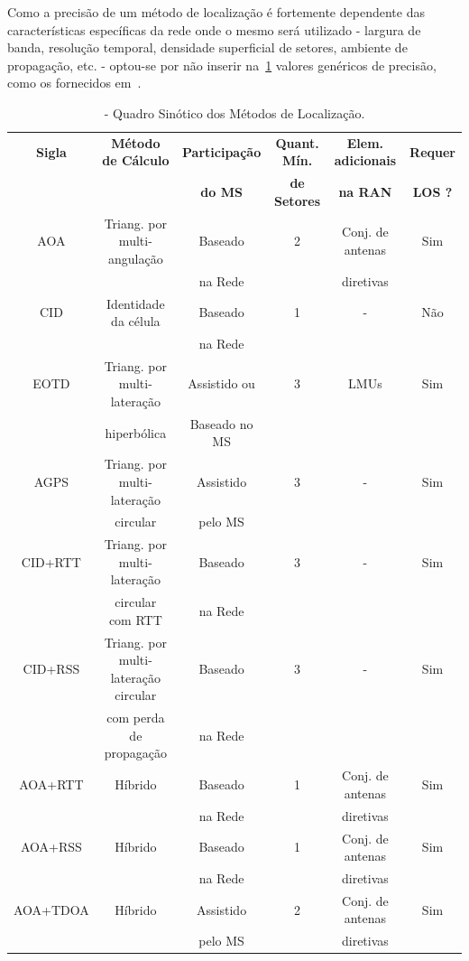 Como a precisão de um método de localização é fortemente dependente das características específicas da rede onde o mesmo será utilizado - largura de banda, resolução temporal, densidade superficial de setores, ambiente de propagação, etc. - optou-se por não inserir na~\ref{tab:quadrosinotico} valores genéricos de precisão, como os fornecidos em~\cite{WlanLocationMethodsSurvey}.

\begin{table}[h]
\centering
\caption{\label{tab:quadrosinotico}- Quadro Sinótico dos Métodos de Localização.}
\vspace*{.1cm}
\begin{scriptsize}
\begin{tabular}{|c|c|c|c|c|c|}
\hline
\textbf{Sigla} & \textbf{Método de Cálculo} & \textbf{Participação} & \textbf{Quant. Mín.} & \textbf{Elem. adicionais} & \textbf{Requer}\\
& & \textbf{do MS} & \textbf{de Setores} & \textbf{na RAN} & \textbf{LOS ?}\\
\hline
AOA	& Triang. por multi-angulação & Baseado & 2	& Conj. de antenas & Sim \\
& & na Rede & & diretivas & \\
\hline
CID	& Identidade da célula	& Baseado & 1	& - & Não\\
& & na Rede & & & \\
\hline
EOTD	& Triang. por multi-lateração &	Assistido ou &	3	& LMUs & Sim \\
& hiperbólica & Baseado no MS & & & \\
\hline
AGPS	& Triang. por multi-lateração & Assistido & 3 & - & Sim \\
& circular & pelo MS & & & \\
\hline
CID+RTT	& Triang. por multi-lateração &	Baseado & 3	& - & Sim \\
& circular com RTT & na Rede & & & \\
\hline
CID+RSS	& Triang. por multi-lateração circular  &	Baseado & 3	& - & Sim \\
& com perda de propagação & na Rede & & & \\
\hline
AOA+RTT	& Híbrido	& Baseado & 1	&  Conj. de antenas & Sim \\
& & na Rede & & diretivas & \\
\hline
AOA+RSS	& Híbrido	& Baseado & 1	&  Conj. de antenas & Sim \\
& & na Rede & & diretivas& \\
\hline
AOA+TDOA	& Híbrido	& Assistido & 2	&  Conj. de antenas & Sim \\
& & pelo MS & & diretivas& \\
\hline
\end{tabular}
\end{scriptsize}
\vspace*{-.2cm}
\end{table}